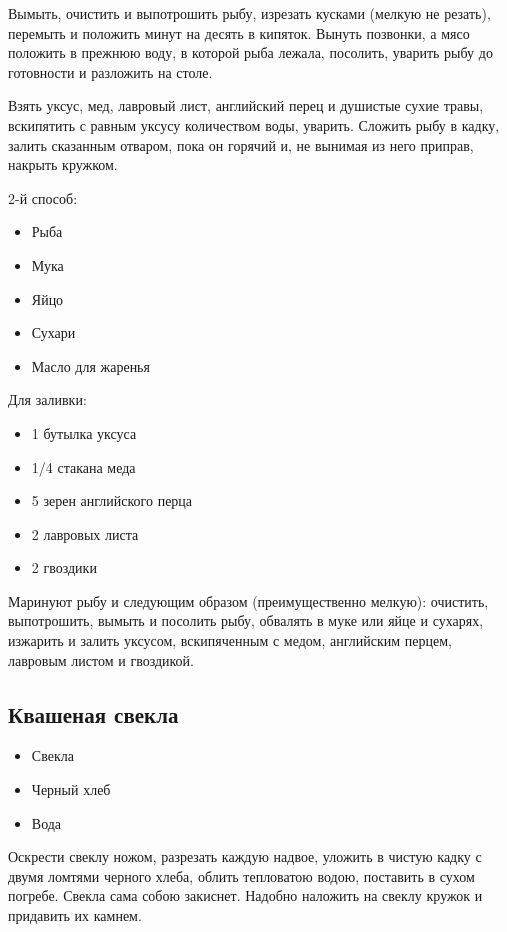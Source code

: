 Вымыть, очистить и выпотрошить рыбу, изрезать кусками (мелкую не резать), перемыть и положить минут на десять в кипяток. Вынуть позвонки, а мясо положить в прежнюю воду, в которой рыба лежала, посолить, уварить рыбу до готовности и разложить на столе.

Взять уксус, мед, лавровый лист, английский перец и душистые сухие травы, вскипятить с равным уксусу количеством воды, уварить. Сложить рыбу в кадку, залить сказанным отваром, пока он горячий и, не вынимая из него приправ, накрыть кружком.

2-й способ: 

\begin{itemize}
	\item Рыба
    \item Мука 
    \item Яйцо
    \item Сухари
    \item Масло для жаренья
\end{itemize}

Для заливки: 

\begin{itemize}
	\item 1 бутылка уксуса
    \item 1/4 стакана меда
    \item 5 зерен английского перца 
    \item 2 лавровых листа
    \item 2 гвоздики
\end{itemize}

Маринуют рыбу и следующим образом (преимущественно мелкую): очистить, выпотрошить, вымыть и посолить рыбу, обвалять в муке или яйце и сухарях, изжарить и залить уксусом, вскипяченным с медом, английским перцем, лавровым листом и гвоздикой.

\subsection{Квашеная свекла}

\begin{itemize}
	\item Свекла
    \item Черный хлеб
    \item Вода
\end{itemize}

Оскрести свеклу ножом, разрезать каждую надвое, уложить в чистую кадку с двумя ломтями черного хлеба, облить тепловатою водою, поставить в сухом погребе. Свекла сама собою закиснет. Надобно наложить на свеклу кружок и придавить их камнем.

